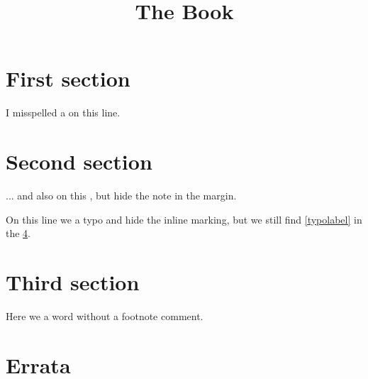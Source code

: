 \documentclass[a4paper,12pt]{article}
\title{The Book}
\begin{document}
\section{First section}\label{sect:first}

I misspelled a  on this line.

\section{Second section}

... and also on this , but hide
the note in the margin.

On this line we  a typo and hide the inline marking, but we
still find \cref{typolabel} in the \cref{chap:errata}.

\section{Third section}

Here we  a word without a footnote comment.

\section{Errata}\label{chap:errata}

\PrintErrata
\end{document}
